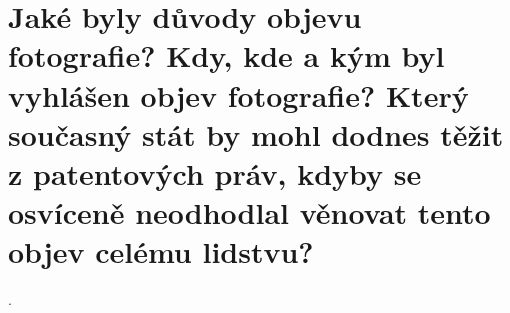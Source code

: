 \section{Jaké byly důvody objevu fotografie? Kdy, kde a kým byl vyhlášen objev fotografie? Který současný stát by mohl 
dodnes těžit z patentových práv, kdyby se osvíceně neodhodlal věnovat tento objev celému lidstvu?}.